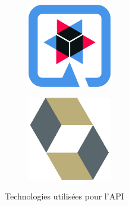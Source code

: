 \begin{figure}[h]
	\centering
	\begin{subfigure}{.45\textwidth}
		\centering
		\includegraphics[width=0.40\textwidth]{assets/quarkus.png}
		\label{fig:quarkus}
	\end{subfigure}
	\begin{subfigure}{.45\textwidth}
		\centering
		\includegraphics[width=0.40\textwidth]{assets/hibernate.png}
		\label{fig:hibernate}
	\end{subfigure}
	\caption{Technologies utilisées pour l'API}
\end{figure}

